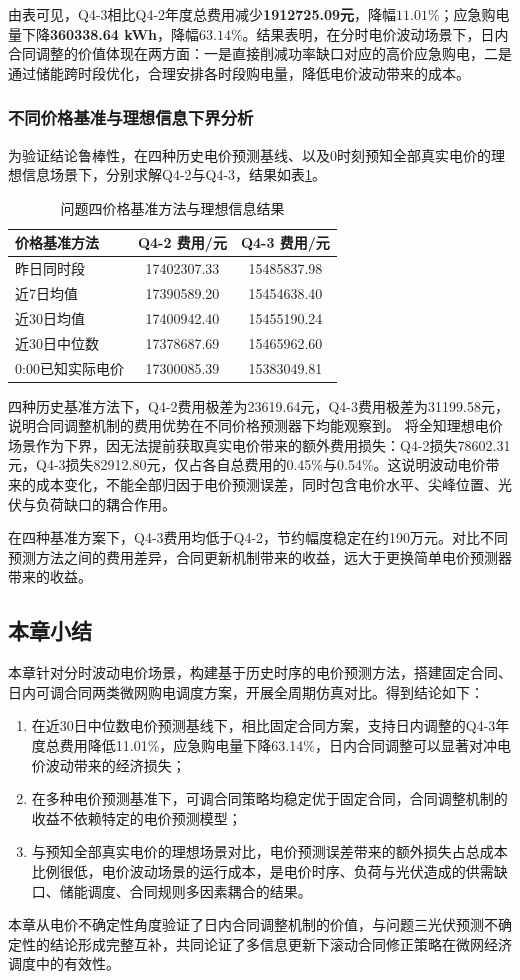 由表可见，Q4-3相比Q4-2年度总费用减少\textbf{1912725.09元}，降幅$11.01\%$；应急购电量下降\textbf{360338.64 kWh}，降幅$63.14\%$。结果表明，在分时电价波动场景下，日内合同调整的价值体现在两方面：一是直接削减功率缺口对应的高价应急购电，二是通过储能跨时段优化，合理安排各时段购电量，降低电价波动带来的成本。

\subsubsection{不同价格基准与理想信息下界分析}
为验证结论鲁棒性，在四种历史电价预测基线、以及0时刻预知全部真实电价的理想信息场景下，分别求解Q4-2与Q4-3，结果如表\ref{tab:q4_price_baseline_oracle}。
\begin{table}[htbp]
\centering
\caption{问题四价格基准方法与理想信息结果}
\label{tab:q4_price_baseline_oracle}
\scriptsize
\begin{tabular}{lcc}
\toprule
价格基准方法 & Q4-2 费用/元 & Q4-3 费用/元 \\
\midrule
昨日同时段 & 17402307.33 & 15485837.98 \\
近7日均值 & 17390589.20 & 15454638.40 \\
近30日均值 & 17400942.40 & 15455190.24 \\
近30日中位数 & 17378687.69 & 15465962.60 \\
0:00已知实际电价 & 17300085.39 & 15383049.81 \\
\bottomrule
\end{tabular}
\end{table}

四种历史基准方法下，Q4-2费用极差为23619.64元，Q4-3费用极差为31199.58元，说明合同调整机制的费用优势在不同价格预测器下均能观察到。
将全知理想电价场景作为下界，因无法提前获取真实电价带来的额外费用损失：Q4-2损失78602.31元，Q4-3损失82912.80元，仅占各自总费用的0.45\%与0.54\%。这说明波动电价带来的成本变化，不能全部归因于电价预测误差，同时包含电价水平、尖峰位置、光伏与负荷缺口的耦合作用。

在四种基准方案下，Q4-3费用均低于Q4-2，节约幅度稳定在约190万元。对比不同预测方法之间的费用差异，合同更新机制带来的收益，远大于更换简单电价预测器带来的收益。

\subsection{本章小结}
本章针对分时波动电价场景，构建基于历史时序的电价预测方法，搭建固定合同、日内可调合同两类微网购电调度方案，开展全周期仿真对比。得到结论如下：
\begin{enumerate}
    \item 在近30日中位数电价预测基线下，相比固定合同方案，支持日内调整的Q4-3年度总费用降低11.01\%，应急购电量下降63.14\%，日内合同调整可以显著对冲电价波动带来的经济损失；
    \item 在多种电价预测基准下，可调合同策略均稳定优于固定合同，合同调整机制的收益不依赖特定的电价预测模型；
    \item 与预知全部真实电价的理想场景对比，电价预测误差带来的额外损失占总成本比例很低，电价波动场景的运行成本，是电价时序、负荷与光伏造成的供需缺口、储能调度、合同规则多因素耦合的结果。
\end{enumerate}

本章从电价不确定性角度验证了日内合同调整机制的价值，与问题三光伏预测不确定性的结论形成完整互补，共同论证了多信息更新下滚动合同修正策略在微网经济调度中的有效性。
